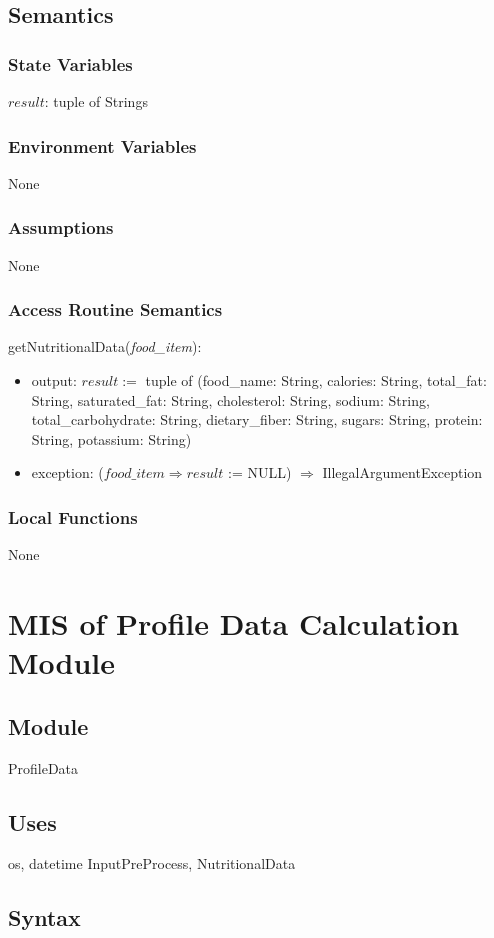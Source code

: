 \documentclass[12pt, titlepage]{article}
\begin{document}
\subsection{Semantics}
\subsubsection{State Variables}
$result$: tuple of Strings
\subsubsection{Environment Variables}
None
\subsubsection{Assumptions}
None
\subsubsection{Access Routine Semantics}
\noindent getNutritionalData(\textit{food\_item}):
\begin{itemize}
	\item output: $result :=$ tuple of (food\_name: String, calories: String, 
	total\_fat: String, saturated\_fat: String, cholesterol: String, sodium: 
	String, total\_carbohydrate: String, dietary\_fiber: String, sugars: 
	String, protein: String, potassium: String)
	\item exception: ($food\_item \Rightarrow result$ := NULL) $\Rightarrow$ \mbox{IllegalArgumentException} 
\end{itemize}
\subsubsection{Local Functions}
None

\newpage

\section{MIS of Profile Data Calculation Module} \label{PDC}
\subsection{Module}
ProfileData
\subsection{Uses}
os, datetime InputPreProcess, NutritionalData
\subsection{Syntax}
\end{document}

